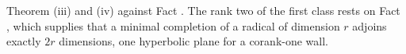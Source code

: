 Theorem (iii) and (iv) against Fact . The rank two of the first class rests on Fact , which supplies that a minimal completion of a radical of dimension $r$ adjoins exactly $2r$ dimensions, one hyperbolic plane for a corank-one wall.
